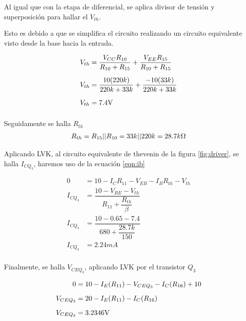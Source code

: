 \begin{enumerate}
        Al igual que con la etapa de diferencial, se aplica divisor de tensión y superposición para hallar el $V_{th}$.

        Esto es debido a que se simplifica el circuito realizando un circuito equivalente visto desde la base hacia la entrada.

        \begin{align*}
          V_{th} & = \dfrac{V_{CC}R_{10}}{R_{10}+R_{15}}+\dfrac{V_{EE}R_{15}}{R_{10}+R_{15}} \\[0.2cm]
          V_{th} & = \dfrac{10(220k)}{220k+33k}+\dfrac{-10(33k)}{220k+33k}                   \\[0.2cm]
          V_{th} & = 7.4 \volt                                                               \\[0.2cm]
        \end{align*}

        Seguidamente se halla $R_{th}$
        \begin{align*}
          R_{th}=R_{15}||R_{10}=33k||220k=28.7k\ohm
        \end{align*}

        Aplicando LVK, al circuito equivalente de thevenin de la figura \ref{fig:driver}, se halla $I_{CQ_3}$, haremos uso de la ecuación \ref{eqn:ib}

        \begin{align*}
          0        & =10-I_CR_{11}-V_{EB}-I_{B}R_{th}-V_{th}                 \\[0.2cm]
          I_{CQ_3} & =\dfrac{10-V_{BE}-V_{th}}{R_{11}+\dfrac{R_{th}}{\beta}} \\[0.2cm]
          I_{CQ_3} & =\dfrac{10-0.65-7.4}{680+\dfrac{28.7k}{150}}            \\[0.2cm]
          I_{CQ_3} & =2.24mA                                                 \\[0.2cm]
        \end{align*}

        Finalmente, se halla $V_{CEQ_3}$, aplicando LVK por el transistor $Q_3$

        \begin{align*}
          0         & =10-I_{E}(R_{11})-V_{CEQ_3}-I_C(R_{16})+10 \\[0.2cm]
          V_{CEQ_3} & =20-I_{E}(R_{11})-I_C(R_{16})              \\[0.2cm]
          V_{CEQ_3} & = 3.2346\volt                              \\[0.2cm]
        \end{align*}


\end{enumerate}
